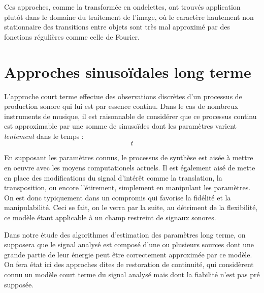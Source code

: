 Ces approches, comme la transformée en ondelettes, ont trouvés application plutôt dans le domaine du traitement de l'image, où le caractère hautement non stationnaire des transitions entre objets sont très mal approximé par des fonctions régulières comme celle de Fourier.

\section{Approches sinusoïdales long terme}  \label{sec:slt}

\cite{mcaulay}

L'approche court terme effectue des observations discrètes d'un processus de production sonore qui lui est par essence continu. Dans le cas de nombreux instruments de musique, il est raisonnable de considérer que ce processus continu est approximable par une somme de sinusoïdes dont les paramètres varient \textsl{lentement} dans le temps :
\begin{equation}
t
\end{equation}

En supposant les paramètres connus, le processus de synthèse est aisée à mettre en oeuvre avec les moyens computationels actuels. Il est également aisé de mette en place des modifications du signal d'intérêt comme la translation, la transposition, ou encore l'étirement, simplement en manipulant les paramètres. On est donc typiquement dans un compromis qui favorise la fidélité et la manipulabilité. Ceci se fait, on le verra par la suite, au détriment de la flexibilité, ce modèle étant applicable à un champ restreint de signaux sonores.

Dans notre étude des algorithmes d'estimation des paramètres long terme, on supposera que le signal analysé est composé d'une ou plusieurs sources dont une grande partie de leur énergie peut être correctement approximée par ce modèle. On fera état ici des approches dites de \og restoration \fg de continuité, qui considèrent connu un modèle court terme du signal analysé mais dont la fiabilité n'est pas pré supposée.


